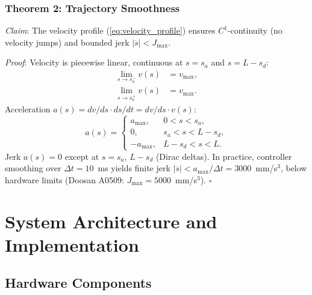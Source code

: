 \documentclass[journal]{IEEEtran}
\begin{document}
\subsubsection{Theorem 2: Trajectory Smoothness}

\textit{Claim}: The velocity profile (\ref{eq:velocity_profile}) ensures $C^1$-continuity (no velocity jumps) and bounded jerk $|\dddot{s}| < J_{\max}$.

\textit{Proof}: Velocity is piecewise linear, continuous at $s = s_a$ and $s = L - s_d$:
\begin{align}
\lim_{s \to s_a^-} v(s) &= v_{\max}, \\
\lim_{s \to s_a^+} v(s) &= v_{\max}.
\end{align}
Acceleration $a(s) = dv/ds \cdot ds/dt = dv/ds \cdot v(s)$:
\begin{equation}
a(s) = 
\begin{cases}
a_{\max}, & 0 < s < s_a, \\
0, & s_a < s < L - s_d, \\
-a_{\max}, & L - s_d < s < L.
\end{cases}
\label{eq:acceleration_profile}
\end{equation}
Jerk $\dot{a}(s) = 0$ except at $s = s_a$, $L - s_d$ (Dirac deltas). In practice, controller smoothing over $\Delta t = 10$~ms yields finite jerk $|\dddot{s}| < a_{\max} / \Delta t = 3000$~mm/s$^3$, below hardware limits (Doosan A0509: $J_{\max} = 5000$~mm/s$^3$). \hfill $\square$

\section{System Architecture and Implementation}

\subsection{Hardware Components}
\end{document}
